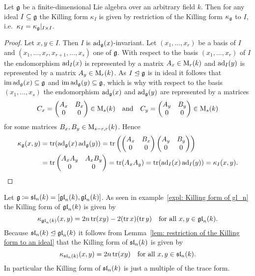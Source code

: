 \begin{lem}\label{lem: restriction of the Killing form to an ideal}
 Let $\mathfrak{g}$ be a finite-dimensional Lie algebra over an arbitrary field $k$. Then for any ideal $I \subseteq \mathfrak{g}$ the Killing form $\kappa_I$ is given by restriction of the Killing form $\kappa_{\mathfrak{g}}$ to $I$, i.e.\ $\kappa_I = \kappa_{\mathfrak{g}}|_{I \times I}$.
\end{lem}
\begin{proof}
 Let $x, y \in I$. Then $I$ is $\operatorname{ad}_{\mathfrak{g}}(x)$-invariant. Let $(x_1, \dotsc, x_r)$ be a basis of $I$ and $(x_1, \dotsc, x_r, x_{r+1}, \dotsc, x_s)$ one of $\mathfrak{g}$. With respect to the basis $(x_1, \dotsc, x_r)$ of $I$ the endomorphism $\operatorname{ad}_I(x)$ is represented by a matrix $A_x \in \operatorname{M}_r(k)$ and $\operatorname{ad}_I(y)$ is represented by a matrix $A_y \in \operatorname{M}_r(k)$. As $I \trianglelefteq \mathfrak{g}$ is in ideal it follows that $\operatorname{im} \operatorname{ad}_{\mathfrak{g}}(x) \subseteq \mathfrak{g}$ and $\operatorname{im} \operatorname{ad}_{\mathfrak{g}}(y) \subseteq \mathfrak{g}$, which is why with respect to the basis $(x_1, \dotsc, x_s)$ the endomorphism $\operatorname{ad}_{\mathfrak{g}}(x)$ and $\operatorname{ad}_{\mathfrak{g}}(y)$ are represented by a matrices
 \[
  C_x = \begin{pmatrix} A_x & B_x \\ 0 & 0 \end{pmatrix} \in \operatorname{M}_s(k)
  \quad\text{and}\quad
  C_y = \begin{pmatrix} A_y & B_y \\ 0 & 0 \end{pmatrix} \in \operatorname{M}_s(k)
 \]
 for some matrices $B_x, B_y \in \operatorname{M}_{s-r,r}(k)$. Hence
 \begin{align*}
  \kappa_{\mathfrak{g}}(x,y)
  &= \operatorname{tr}(\operatorname{ad}_{\mathfrak{g}}(x) \operatorname{ad}_{\mathfrak{g}}(y))
  = \operatorname{tr}\left( \begin{pmatrix} A_x & B_x \\ 0 & 0 \end{pmatrix} \begin{pmatrix} A_y & B_y \\ 0 & 0 \end{pmatrix} \right) \\
  &= \operatorname{tr} \begin{pmatrix} A_x A_y & A_x B_y \\ 0 & 0 \end{pmatrix}
  = \operatorname{tr}(A_x A_y)
  = \operatorname{tr}(\operatorname{ad}_I(x) \operatorname{ad}_I(y))
  = \kappa_I(x,y).
 \qedhere
 \end{align*}
\end{proof}


\begin{expl}
 Let $\mathfrak{g} \coloneqq \mathfrak{sl}_n(k) = [\mathfrak{gl}_n(k), \mathfrak{gl}_n(k)]$. As seen in example~\ref{expl: Killing form of gl_n} the Killing form of $\mathfrak{gl}_n(k)$ is given by
 \[
  \kappa_{\mathfrak{gl}_n(k)}(x,y) = 2n \operatorname{tr}(xy) - 2(\operatorname{tr} x)(\operatorname{tr} y)
  \quad \text{for all $x,y \in \mathfrak{gl}_n(k)$}.
 \]
 Because $\mathfrak{sl}_n(k) \trianglelefteq \mathfrak{gl}_n(k)$ it follows from Lemma~\ref{lem: restriction of the Killing form to an ideal} that the Killing form of $\mathfrak{sl}_n(k)$ is given by
 \[
  \kappa_{\mathfrak{sl}_n(k)}(x,y) = 2n \operatorname{tr}(xy) \quad \text{for all $x,y \in \mathfrak{sl}_n(k)$}.
 \]
 In particular the Killing form of $\mathfrak{sl}_n(k)$ is just a multiple of the trace form.
\end{expl}


